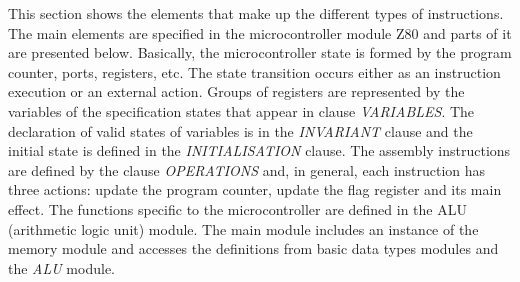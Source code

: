 \documentclass[a4paper]{llncs}
\begin{document}
This section shows the elements that make up the different types of
instructions. The main elements are specified in the microcontroller
module Z80 and parts of it are presented below.  Basically, the
microcontroller state is formed by the program counter, ports,
registers, etc. The state transition occurs either as an instruction
execution or an external action. Groups of registers are represented
by the variables of the specification states that appear in clause
\textit{VARIABLES}. The declaration of valid states of variables is in
the \textit{INVARIANT} clause and the initial state is defined in the
\textit{INITIALISATION} clause. The assembly instructions are defined
by the clause \textit{OPERATIONS} and, in general, each instruction
has three actions: update the program counter, update the flag
register and its main effect.
The functions specific to the microcontroller are defined in the ALU
(arithmetic logic unit) module. The main module includes an instance of
the memory module and accesses the definitions from basic data types
modules and the \textit{ALU} module.
%
%	
%	  
%
\end{document}
